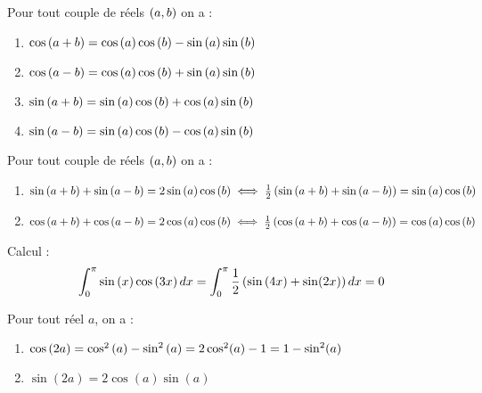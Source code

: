 \begin{formu} 
	Pour tout couple de réels \(\left(a,b\right)\) on a :
	\begin{enumerate}
		\item \( \cos\left(a+b\right) = \cos\left(a\right) \cos\left(b\right) - \sin\left(a\right) \sin\left(b\right) \) \\
		\item \( \cos\left(a-b\right) = \cos\left(a\right) \cos\left(b\right) + \sin\left(a\right) \sin\left(b\right) \)\\
		\item \( \sin\left(a+b\right) = \sin\left(a\right) \cos\left(b\right) + \cos\left(a\right) \sin\left(b\right) \) \\
		\item \( \sin\left(a-b\right) = \sin\left(a\right) \cos\left(b\right) - \cos\left(a\right) \sin\left(b\right) \)\\
	\end{enumerate}
\end{formu}

\begin{formu}
	Pour tout couple de réels \(\left(a,b\right)\) on a :
	\begin{enumerate}
		\item \( \sin\left(a+b\right) + \sin\left(a-b\right) = 2\sin\left(a\right) \cos\left(b\right) \iff \frac{1}{2}\left(\sin\left(a+b\right) + \sin\left(a-b\right)\right) = \sin\left(a\right) \cos\left(b\right)\) \\
		\item \( \cos\left(a+b\right) + \cos\left(a-b\right) = 2\cos\left(a\right) \cos\left(b\right) \iff \frac{1}{2}\left(\cos\left(a+b\right) + \cos\left(a-b\right)\right) = \cos\left(a\right) \cos\left(b\right)\)

	\end{enumerate}

\end{formu}

\begin{appl}
	Calcul : \[\int_{0}^{\pi} \sin\left(x\right) \cos\left(3x\right) dx = \int_{0}^{\pi} \frac{1}{2} \left(\sin\left(4x\right)+\sin(2x)\right)dx = 0\]
\end{appl}

\begin{formu}
	Pour tout réel \(a\), on a :
	\begin{enumerate}
		\item \(\cos\left(2a\right) = \cos^2\left(a\right) - \sin^2\left(a\right) = 2\cos^2(a)-1 = 1-\sin^2(a) \)
		\item \(\sin(2a) = 2\cos(a)\sin(a) \)
	\end{enumerate}
\end{formu}

